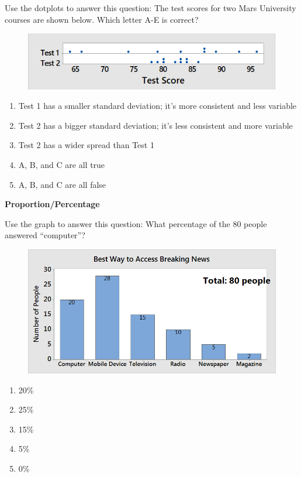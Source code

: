 \documentclass[11.5pt]{sig-alternate} %
\begin{document}
\begin{large}
Use the dotplots to answer this question: The test scores for two Mars University courses are shown below. Which letter A-E is correct?
 \begin{figure}[h]
     \centering
     \includegraphics[width=0.5\linewidth]{images/q4.png}
 \end{figure}
\begin{enumerate}[label=\Alph*.]
    \item Test 1 has a smaller standard deviation; it’s more consistent and less variable
    \item Test 2 has a bigger standard deviation; it’s less consistent and more variable
    \item Test 2 has a wider spread than Test 1
    \item A, B, and C are all true
    \item A, B, and C are all false
\end{enumerate}

\textbf{Proportion/Percentage}

Use the graph to answer this question: What percentage of the 80 people answered “computer”? 
\begin{figure}[h]
    \centering
    \includegraphics[width=0.5\linewidth]{images/q5.png}
\end{figure}
\begin{enumerate}[label=\Alph*.]
    \item 20\%
    \item 25\%
    \item 15\%
    \item 5\%
    \item 0\%
\end{enumerate}


\end{large}
\end{document}
